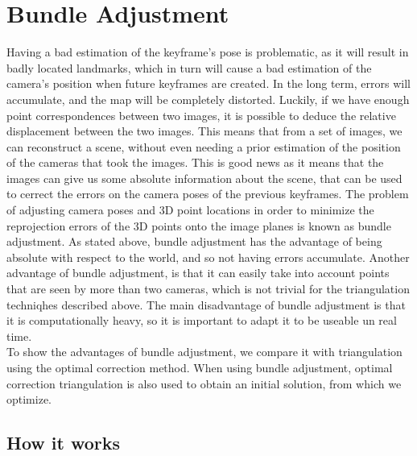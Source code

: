 \section{Bundle Adjustment}
Having a bad estimation of the keyframe's pose is problematic, as it will result in badly located landmarks, which in turn will cause a bad estimation of the camera's position when future keyframes are created. In the long term, errors will accumulate, and the map will be completely distorted. Luckily, if we have enough point correspondences between two images, it is possible to deduce the relative displacement between the two images. This means that from a set of images, we can reconstruct a scene, without even needing a prior estimation of the position of the cameras that took the images. This is good news as it means that the images can give us some absolute information about the scene, that can be used to cerrect the errors on the camera poses of the previous keyframes. The problem of adjusting camera poses and 3D point locations in order to minimize the reprojection errors of the 3D points onto the image planes is known as bundle adjustment. As stated above, bundle adjustment has the advantage of being absolute with respect to the world, and so not having errors accumulate. Another advantage of bundle adjustment, is that it can easily take into account points that are seen by more than two cameras, which is not trivial for the triangulation techniqhes described above. The main disadvantage of bundle adjustment is that it is computationally heavy, so it is important to adapt it to be useable un real time.\\
To show the advantages of bundle adjustment, we compare it with triangulation using the optimal correction method. When using bundle adjustment, optimal correction triangulation is also used to obtain an initial solution, from which we optimize.
\subsection{How it works}

